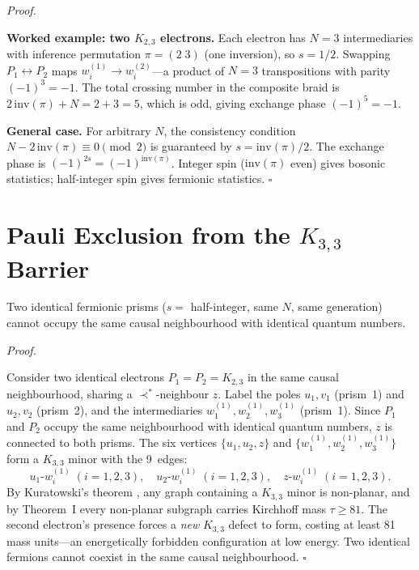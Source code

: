 \documentclass[11pt, a4paper, openany]{book}
\newcommand{\covers}{\prec^*}              %
\renewenvironment{proof}[1][Proof]{%
  \par\noindent\textit{#1.}\quad
}{\hfill$\square$\par\medskip}
\begin{document}
\begin{proof}
\textbf{Worked example: two $K_{2,3}$ electrons.}
Each electron has $N = 3$ intermediaries with inference permutation
$\pi = (2\;3)$ (one inversion), so $s = 1/2$. Swapping
$P_1 \leftrightarrow P_2$ maps $w_i^{(1)} \to w_i^{(2)}$---a product
of $N = 3$ transpositions with parity $(-1)^3 = -1$. The total
crossing number in the composite braid is
$2\,\mathrm{inv}(\pi) + N = 2 + 3 = 5$, which is odd, giving
exchange phase $(-1)^5 = -1$.

\textbf{General case.} For arbitrary $N$, the consistency condition
$N - 2\,\mathrm{inv}(\pi) \equiv 0 \pmod{2}$ is guaranteed by
$s = \mathrm{inv}(\pi)/2$. The exchange phase is
$(-1)^{2s} = (-1)^{\mathrm{inv}(\pi)}$. Integer spin
($\mathrm{inv}(\pi)$ even) gives bosonic statistics; half-integer
spin gives fermionic statistics.
\end{proof}

\section{Pauli Exclusion from the $K_{3,3}$ Barrier}

\begin{corollary}\label{cor:pauli}
Two identical fermionic prisms ($s = $ half-integer, same $N$, same generation) cannot occupy the same causal neighbourhood with identical quantum numbers.
\end{corollary}

\begin{proof}
Consider two identical electrons $P_1 = P_2 = K_{2,3}$ in the same
causal neighbourhood, sharing a $\covers$-neighbour $z$. Label the
poles $u_1, v_1$ (prism~1) and $u_2, v_2$ (prism~2), and the
intermediaries $w_1^{(1)}, w_2^{(1)}, w_3^{(1)}$ (prism~1). Since
$P_1$ and $P_2$ occupy the same neighbourhood with identical quantum
numbers, $z$ is connected to both prisms. The six vertices
$\{u_1, u_2, z\}$ and $\{w_1^{(1)}, w_2^{(1)}, w_3^{(1)}\}$ form
a $K_{3,3}$ minor with the 9~edges:
\[
  u_1\text{-}w_i^{(1)}\;(i=1,2,3), \quad
  u_2\text{-}w_i^{(1)}\;(i=1,2,3), \quad
  z\text{-}w_i^{(1)}\;(i=1,2,3).
\]
By Kuratowski's theorem \cite{kuratowski1930}, any graph containing a
$K_{3,3}$ minor is non-planar, and by Theorem~I every non-planar
subgraph carries Kirchhoff mass $\tau \geq 81$.  The second electron's
presence forces a \emph{new} $K_{3,3}$ defect to form, costing at least
81 mass units---an energetically forbidden configuration at low energy.
Two identical fermions cannot coexist in the same causal neighbourhood.
\end{proof}
\end{document}
